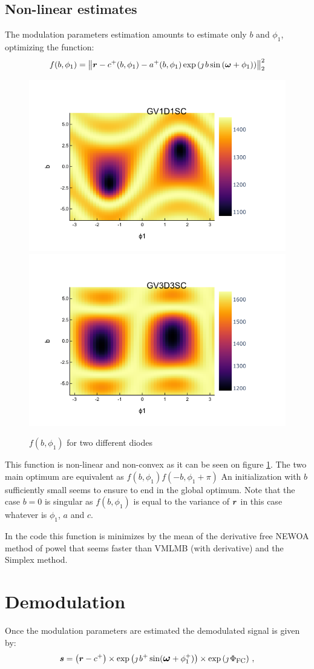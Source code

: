 \documentclass[a4paper,11pt,twoside]{scrartcl}
\begin{document}
\subsection{Non-linear estimates}
The modulation parameters estimation amounts to estimate only $b$  and $\phi_1$, optimizing the function:
\begin{equation}
   f(b,\phi_1) = \left\Vert \boldsymbol{r} -  c^+(b,\phi_1) - a^+(b,\phi_1) \exp\left( \jmath \, b \sin\left( \boldsymbol{\omega} + \phi_1\right)\right) \right\Vert_2^2\label{eq:nl}
\end{equation}
\begin{figure}
    \centering
    \includegraphics[width=0.45\linewidth]{figs/GV1D1SC.png}
    \includegraphics[width=0.45\linewidth]{figs/GV3D3SC.png}
    \caption{$f(b,\phi_1)$ for two different diodes}
    \label{fig:GV1D1SC}
\end{figure}

This function is non-linear and non-convex as it can be seen on figure \ref{fig:GV1D1SC}. The two main optimum are equivalent as $f(b,\phi_1) f(-b,\phi_1+ \pi )$ An initialization with $b$ sufficiently small seems to ensure to end in the global optimum. Note that the case $b=0$ is singular  as $f(b,\phi_1)$ is equal to the variance of $\boldsymbol{r}$ in this case whatever is $\phi_1$, $a$ and $ c$.

In the code this function is minimizes by the mean of the derivative free NEWOA method of powel that seems faster than VMLMB (with derivative) and  the Simplex method.
\section{Demodulation}
Once the modulation parameters are estimated the demodulated signal is given by:
\begin{equation}
\boldsymbol{s} =\left(\boldsymbol{r} - c^+\right)\times\exp\left( \jmath \, b^+ \sin\large( \boldsymbol{\omega} + \phi^+_1\large)\right)\times\exp\left(\jmath\,\Phi_\textrm{FC}\right)\,,\label{eq:demodulation}
\end{equation}
\end{document}
